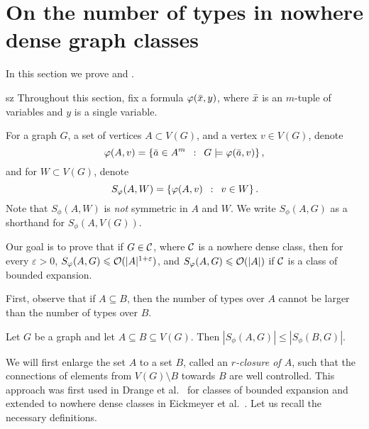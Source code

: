 \section{On the number of types in nowhere dense graph classes}

In this section we prove  and .
\begin{change}{sz}
Throughout this section, fix a formula  $\varphi(\bar{x},y)$, where
$\bar{x}$ is an $m$-tuple of variables and $y$ is a single variable.

For a graph $G$, a set of  vertices $A\subset V(G)$, and a vertex $v\in V(G)$,
denote
\[\varphi(A,v)=\left\{\bar{a} \in A^m  \,~:~\,  G\models\varphi(\bar{a},v) \right\},\]
and for $W\subset V(G)$, denote
\[S_\varphi(A,W)=\left\{\varphi(A,v) \,~:~\,  v\in W \right\}.\]
Note that $S_\phi(A,W)$ is \emph{not} symmetric in $A$ and $W$.
We write $S_\phi(A,G)$ as a shorthand for $S_\phi(A,V(G))$.

Our goal is to prove that if $G\in \mathcal{C}$, where $\mathcal{C}$ is a nowhere dense class,
then for every $\varepsilon>0$,   $S_\varphi(A,G)\leqslant \mathcal{O}(|A|^{1+\varepsilon})$, and 
$S_\varphi(A,G)\leqslant \mathcal{O}(|A|)$ if $\mathcal{C}$ is a class of bounded expansion.
\end{change}

First, observe that if $A\subseteq B$, then the number of types
over $A$ cannot be larger than the number of types over $B$. 

\begin{lemma}\label{lem:types-over-B}
Let $G$ be a graph and let $A\subseteq B\subseteq V(G)$. Then 
$|S_\phi(A,G)|\leq |S_\phi(B,G)|$. 
\end{lemma}

We will first enlarge the set $A$ to a set $B$, called
an \emph{$r$-closure of $A$}, such 
that the connections of elements from $V(G)\setminus B$ 
towards $B$ are well controlled. This approach
was first used in Drange et al.~\cite{drange2016kernelization} for
classes of bounded expansion and extended to nowhere dense
classes in Eickmeyer et al.~\cite{eickmeyer2016neighborhood}. 
Let us recall the necessary definitions.

